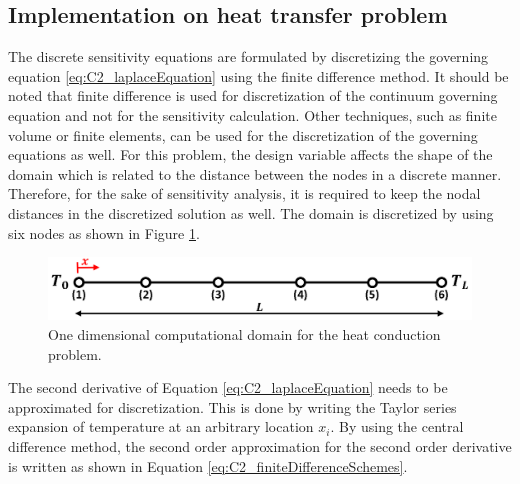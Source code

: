 \subsection{Implementation on heat transfer problem}
The discrete sensitivity equations are formulated by discretizing the governing equation \eqref{eq:C2_laplaceEquation} using the finite difference method. It should be noted that finite difference is used for discretization of the continuum governing equation and not for the sensitivity calculation. Other techniques, such as finite volume or finite elements, can be used for the discretization of the governing equations as well. For this problem, the design variable affects the shape of the domain which is related to the distance between the nodes in a discrete manner. Therefore, for the sake of sensitivity analysis, it is required to keep the nodal distances in the discretized solution as well. The domain is discretized by using six nodes as shown in Figure \ref{fig:C2_discretizedDomain}.
%
\begin{figure}[h]
    \centering
    \includegraphics[width=14.00cm]{Chapter_2/figure/benchmark_case_computational_domain.png}
    \caption{One dimensional computational domain for the heat conduction problem.}
    \label{fig:C2_discretizedDomain}
\end{figure}
%
The second derivative of Equation \eqref{eq:C2_laplaceEquation} needs to be approximated for discretization. This is done by writing the Taylor series expansion of temperature at an arbitrary location $x_i$. By using the central difference method, the second order approximation for the second order derivative is written as shown in Equation \eqref{eq:C2_finiteDifferenceSchemes}.

